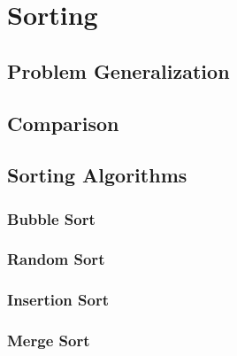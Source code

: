 \chapter{Sorting}


\section{Problem Generalization}

\section{Comparison}
\csharpsubsection{\csharp}

\section{Sorting Algorithms}

\subsection{Bubble Sort}
\csharpsubsubsection{\csharp}

\subsection{Random Sort}
\csharpsubsubsection{\csharp}

\subsection{Insertion Sort}
\csharpsubsubsection{\csharp}

\subsection{Merge Sort}
\csharpsubsubsection{\csharp}

